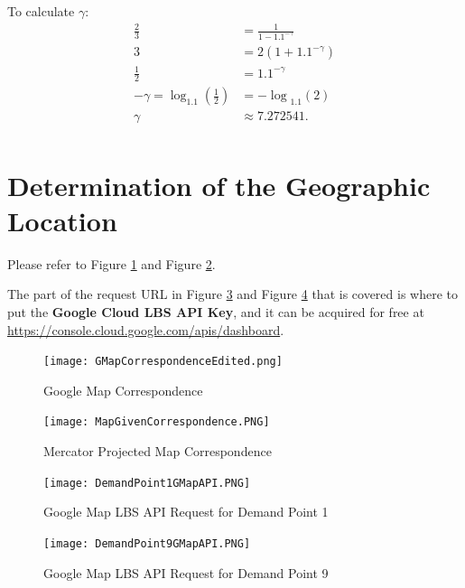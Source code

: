 \documentclass[10pt]{article}
\begin{document}
\newline
To calculate $\gamma$:
\begin{align*}
    \frac{2}{3} & =\frac{1}{1-{1.1}^{-\gamma}}\\
    3 & = 2(1+{1.1}^{-\gamma})\\
    \frac{1}{2} & ={1.1}^{-\gamma}\\
    -\gamma=\log_{1.1}\left(\frac{1}{2}\right) & ={-\log}_{1.1}{(2)}\\
    \gamma & \approx 7.272541.\\
\end{align*}

\section{Determination of the Geographic Location}
Please refer to Figure \ref{fig:gmap_corre} and Figure \ref{fig:map_given_corre}.

The part of the request URL in Figure \ref{fig:dp_1_gmap_api} and Figure \ref{fig:dp_9_gmap_api} that is covered is where to put the \textbf{Google Cloud LBS API Key}, and it can be acquired for free at \href{https://console.cloud.google.com/apis/dashboard}{https://console.cloud.google.com/apis/dashboard}.

\begin{figure}[!htbp]
    \centering
    \texttt{[image: GMapCorrespondenceEdited.png]}
    \caption{Google Map Correspondence}
    \label{fig:gmap_corre}
\end{figure}
\begin{figure}[!htbp]
    \centering
    \texttt{[image: MapGivenCorrespondence.PNG]}
    \caption{Mercator Projected Map Correspondence}
    \label{fig:map_given_corre}
\end{figure}
\begin{figure}[!htbp]
    \centering
    \texttt{[image: DemandPoint1GMapAPI.PNG]}
    \caption{Google Map LBS API Request for Demand Point 1}
    \label{fig:dp_1_gmap_api}
\end{figure}
\begin{figure}[!htbp]
    \centering
    \texttt{[image: DemandPoint9GMapAPI.PNG]}
    \caption{Google Map LBS API Request for Demand Point 9}
    \label{fig:dp_9_gmap_api}
\end{figure}
\pagestyle{empty}
\end{document}
